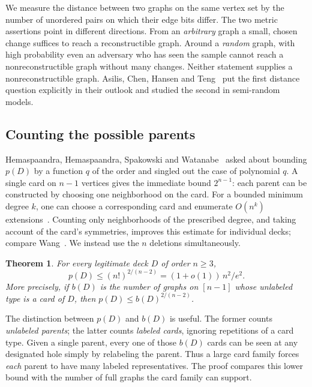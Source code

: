 \documentclass[11pt]{article}
\newtheorem{theorem}{Theorem}
\theoremstyle{definition}\newtheorem{definition}[theorem]{Definition}\theoremstyle{plain}
\begin{document}
We measure the distance between two graphs on the same vertex set by the number of unordered pairs on which their edge bits differ. The two metric assertions point in different directions. From an \emph{arbitrary} graph a small, chosen change suffices to reach a reconstructible graph. Around a \emph{random} graph, with high probability even an adversary who has seen the sample cannot reach a nonreconstructible graph without many changes. Neither statement supplies a nonreconstructible graph. Asilis, Chen, Hansen and Teng~\cite{acht} put the first distance question explicitly in their outlook and studied the second in semi-random models.

\subsection*{Counting the possible parents}
Hemaspaandra, Hemaspaandra, Spakowski and Watanabe~\cite[Conj.~4.5]{hhsw} asked about bounding $p(D)$ by a function $q$ of the order and singled out the case of polynomial $q$. A single card on $n-1$ vertices gives the immediate bound $2^{n-1}$: each parent can be constructed by choosing one neighborhood on the card. For a bounded minimum degree $k$, one can choose a corresponding card and enumerate $O(n^k)$ extensions~\cite[proof of Thm.~6.1]{kh}. Counting only neighborhoods of the prescribed degree, and taking account of the card's symmetries, improves this estimate for individual decks; compare Wang~\cite[Thms.~14.4 and 15.2]{wang}. We instead use the $n$ deletions simultaneously.

\begin{theorem}\label{thm:main}
For every legitimate deck $D$ of order $n\ge3$,
\[
p(D)\le (n!)^{2/(n-2)}=(1+o(1))\,n^2/e^2 .
\]
More precisely, if $b(D)$ is the number of graphs on $[n-1]$ whose unlabeled type is a card of $D$, then $p(D)\le b(D)^{2/(n-2)}$.
\end{theorem}

The distinction between $p(D)$ and $b(D)$ is useful. The former counts \emph{unlabeled parents}; the latter counts \emph{labeled cards}, ignoring repetitions of a card type. Given a single parent, every one of those $b(D)$ cards can be seen at any designated hole simply by relabeling the parent. Thus a large card family forces \emph{each} parent to have many labeled representatives. The proof compares this lower bound with the number of full graphs the card family can support.
\end{document}
